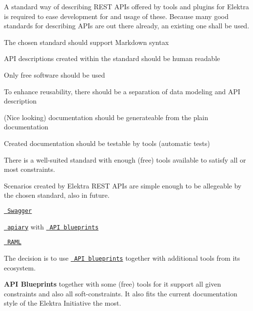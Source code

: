 A standard way of describing R\+E\+ST A\+P\+Is offered by tools and plugins for Elektra is required to ease development for and usage of these. Because many good standards for describing A\+P\+Is are out there already, an existing one shall be used.


\begin{DoxyItemize}
\item The chosen standard should support Markdown syntax
\item A\+PI descriptions created within the standard should be human readable
\item Only free software should be used
\item To enhance reusability, there should be a separation of data modeling and A\+PI description
\end{DoxyItemize}


\begin{DoxyItemize}
\item (Nice looking) documentation should be generateable from the plain documentation
\item Created documentation should be testable by tools (automatic tests)
\end{DoxyItemize}


\begin{DoxyItemize}
\item There is a well-\/suited standard with enough (free) tools available to satisfy all or most constraints.
\item Scenarios created by Elektra R\+E\+ST A\+P\+Is are simple enough to be allegeable by the chosen standard, also in future.
\end{DoxyItemize}


\begin{DoxyItemize}
\item \href{http://swagger.io/}{\texttt{ Swagger}}
\item \href{https://apiary.io/}{\texttt{ apiary}} with \href{https://apiblueprint.org/}{\texttt{ A\+PI blueprints}}
\item \href{http://raml.org/}{\texttt{ R\+A\+ML}}
\end{DoxyItemize}

The decision is to use \href{https://apiblueprint.org/}{\texttt{ A\+PI blueprints}} together with additional tools from its ecosystem.

{\bfseries{A\+PI Blueprints}} together with some (free) tools for it support all given constraints and also all soft-\/constraints. It also fits the current documentation style of the Elektra Initiative the most.

